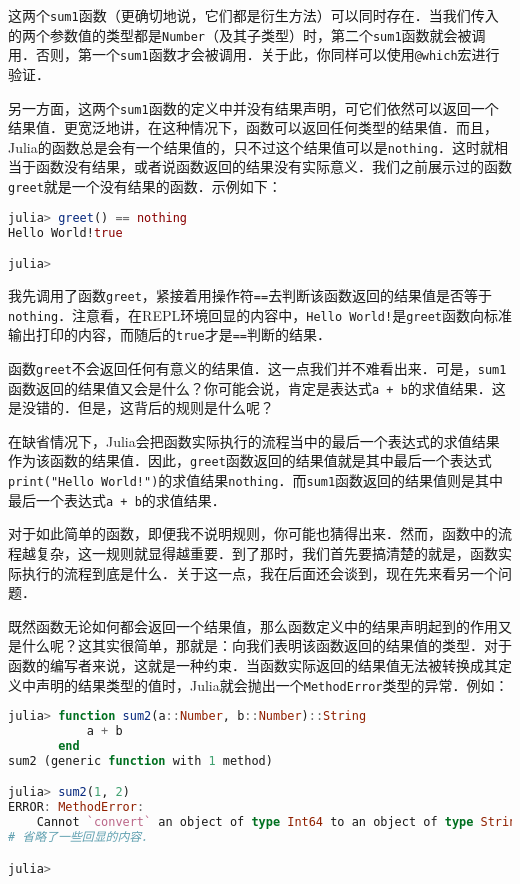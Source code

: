 这两个\verb|sum1|函数（更确切地说，它们都是衍生方法）可以同时存在．当我们传入的两个参数值的类型都是\verb|Number|（及其子类型）时，第二个\verb|sum1|函数就会被调用．否则，第一个\verb|sum1|函数才会被调用．关于此，你同样可以使用\verb|@which|宏进行验证．

另一方面，这两个\verb|sum1|函数的定义中并没有结果声明，可它们依然可以返回一个结果值．更宽泛地讲，在这种情况下，函数可以返回任何类型的结果值．而且，Julia的函数总是会有一个结果值的，只不过这个结果值可以是\verb|nothing|．这时就相当于函数没有结果，或者说函数返回的结果没有实际意义．我们之前展示过的函数\verb|greet|就是一个没有结果的函数．示例如下：

\begin{lstlisting}[language=julia]
julia> greet() == nothing
Hello World!true

julia> 
\end{lstlisting}

我先调用了函数\verb|greet|，紧接着用操作符\verb|==|去判断该函数返回的结果值是否等于\verb|nothing|．注意看，在REPL环境回显的内容中，\verb|Hello World!|是\verb|greet|函数向标准输出打印的内容，而随后的\verb|true|才是\verb|==|判断的结果．

函数\verb|greet|不会返回任何有意义的结果值．这一点我们并不难看出来．可是，\verb|sum1|函数返回的结果值又会是什么？你可能会说，肯定是表达式\verb|a + b|的求值结果．这是没错的．但是，这背后的规则是什么呢？

在缺省情况下，Julia会把函数实际执行的流程当中的最后一个表达式的求值结果作为该函数的结果值．因此，\verb|greet|函数返回的结果值就是其中最后一个表达式\verb|print("Hello World!")|的求值结果\verb|nothing|．而\verb|sum1|函数返回的结果值则是其中最后一个表达式\verb|a + b|的求值结果．

对于如此简单的函数，即便我不说明规则，你可能也猜得出来．然而，函数中的流程越复杂，这一规则就显得越重要．到了那时，我们首先要搞清楚的就是，函数实际执行的流程到底是什么．关于这一点，我在后面还会谈到，现在先来看另一个问题．

既然函数无论如何都会返回一个结果值，那么函数定义中的结果声明起到的作用又是什么呢？这其实很简单，那就是：向我们表明该函数返回的结果值的类型．对于函数的编写者来说，这就是一种约束．当函数实际返回的结果值无法被转换成其定义中声明的结果类型的值时，Julia就会抛出一个\verb|MethodError|类型的异常．例如：

\begin{lstlisting}[language=julia]
julia> function sum2(a::Number, b::Number)::String
           a + b
       end
sum2 (generic function with 1 method)

julia> sum2(1, 2)
ERROR: MethodError: 
    Cannot `convert` an object of type Int64 to an object of type String
# 省略了一些回显的内容．

julia> 
\end{lstlisting}

